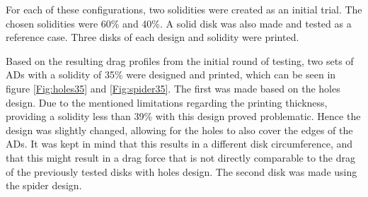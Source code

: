 For each of these configurations, two solidities were created as an initial trial. The chosen solidities were 60\% and 40\%. A solid disk was also made and tested as a reference case. Three disks of each design and solidity were printed. 

Based on the resulting drag profiles from the initial round of testing, two sets of \gls{AD}s with a solidity of 35\% were designed and printed, which can be seen in figure \ref{Fig:holes35} and \ref{Fig:spider35}. The first was made based on the \gls{holes} design. Due to the mentioned limitations regarding the printing thickness, providing a solidity less than 39\% with this design proved problematic. Hence the design was slightly changed, allowing for the holes to also cover the edges of the \gls{AD}s. It was kept in mind that this results in a different disk circumference, and that this might result in a drag force that is not directly comparable to the drag of the previously tested disks with \gls{holes} design. The second disk was made using the \gls{spider} design. 

